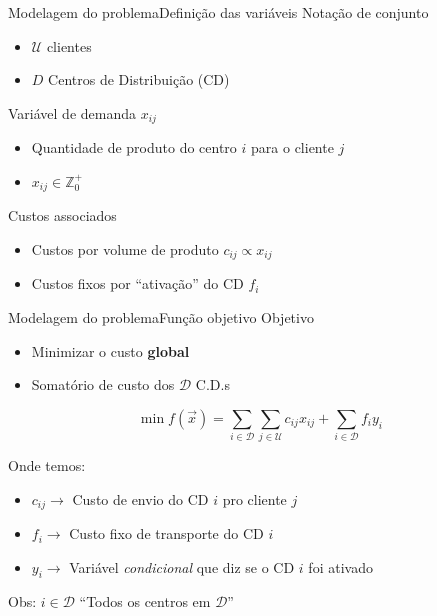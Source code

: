 \documentclass{beamer}
\newenvironment{outeritemize}{\begin{itemize}}{\end{itemize}\vspace{12pt}}
\begin{document}
\begin{frame}{Modelagem do problema}{Definição das variáveis}
    Notação de conjunto
    \begin{outeritemize}
        \item $\mathcal{U}$ clientes
        \item $D$ Centros de Distribuição (CD)
    \end{outeritemize}
    Variável de demanda $x_{ij}$
    \begin{outeritemize}
        \item Quantidade de produto do centro $i$ para o cliente $j$
        \item $x_{ij}\in \mathbb{Z}^{+}_{0}$
    \end{outeritemize}
    Custos associados
    \begin{itemize}
        \item Custos por volume de produto $c_{ij}\propto x_{ij}$
        \item Custos fixos por ``ativação'' do CD $f_i$
    \end{itemize}
\end{frame}

\begin{frame}{Modelagem do problema}{Função objetivo}
    Objetivo
    \begin{outeritemize}
        \item Minimizar o custo \textbf{global}
        \item Somatório de custo dos $\mathcal{D}$ C.D.s
    \end{outeritemize}
    \begin{equation*}
       \min f(\vec{x})= \sum_{i\in\mathcal{D}}\sum_{j\in\mathcal{U}}c_{ij}x_{ij} + \sum_{i\in\mathcal{D}}f_iy_i
    \end{equation*}
    \vspace{12pt}
    
    Onde temos:
    \begin{itemize}
        \item $c_{ij}\to$ Custo de envio do CD $i$ pro cliente $j$
        \item $f_i\to$ Custo fixo de transporte do CD $i$
        \item $y_i\to$ Variável \textit{condicional} que diz se o CD $i$ foi ativado
    \end{itemize} 

    \vspace{12pt}
    Obs: $i\in\mathcal{D}$ ``Todos os centros em $\mathcal{D}$''
\end{frame}
\end{document}
